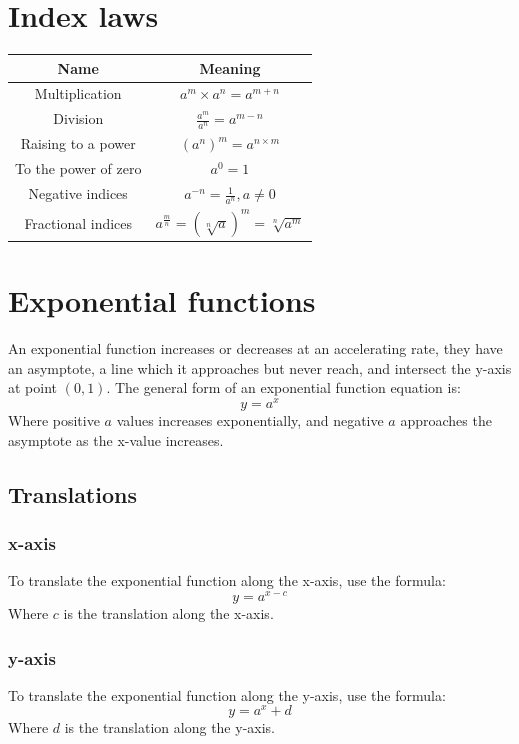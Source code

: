 \documentclass{book}
\begin{document}
\chapter{Index laws}
\begin{center}
	\begin{tabular}{c|c}
		Name                 & Meaning                                             \\ \hline
		Multiplication       & $a^m \times a^n = a^{m + n}$                        \\
		Division             & $\frac{a^m}{a^n} = a^{m - n}$                       \\
		Raising to a power   & $(a^n)^m = a^{n \times m}$                          \\
		To the power of zero & $a^0 = 1$                                           \\
		Negative indices     & $a^{-n} = \frac{1}{a^n}, a \not = 0$                \\
		Fractional indices   & $a^{\frac{m}{n}} = (\sqrt[n]{a})^m = \sqrt[n]{a^m}$
	\end{tabular}
\end{center}

\chapter{Exponential functions}
An exponential function increases or decreases at an accelerating rate, they have an asymptote, a line which it approaches but never reach, and intersect the y-axis at point $(0, 1)$.  The general form of an exponential function equation is:
\[
	y = a^x
\]
Where positive $a$ values increases exponentially, and negative $a$ approaches the asymptote as the x-value increases.

\section{Translations}
\subsection{x-axis}
To translate the exponential function along the x-axis, use the formula:
\[
	y = a^{x - c}
\]
Where $c$ is the translation along the x-axis.\\

\subsection{y-axis}
To translate the exponential function along the y-axis, use the formula:
\[
	y = a^x + d
\]
Where $d$ is the translation along the y-axis.
\end{document}
